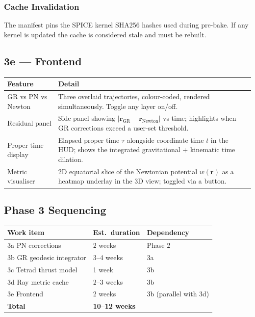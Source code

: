 \documentclass[11pt, a4paper]{article}
\begin{document}
\subsubsection{Cache Invalidation}

The manifest pins the SPICE kernel SHA256 hashes used during pre-bake. If any
kernel is updated the cache is considered stale and must be rebuilt.

\subsection{3e — Frontend}

\begin{center}
\begin{tabularx}{\textwidth}{L{3.5cm} X}
  \toprule
  \textbf{Feature} & \textbf{Detail} \\
  \midrule
  GR vs PN vs Newton &
    Three overlaid trajectories, colour-coded, rendered simultaneously.
    Toggle any layer on/off. \\[4pt]
  Residual panel &
    Side panel showing $|\mathbf{r}_\text{GR} - \mathbf{r}_\text{Newton}|$
    vs time; highlights when GR corrections exceed a user-set threshold. \\[4pt]
  Proper time display &
    Elapsed proper time $\tau$ alongside coordinate time $t$ in the HUD;
    shows the integrated gravitational + kinematic time dilation. \\[4pt]
  Metric visualiser &
    2D equatorial slice of the Newtonian potential $w(\mathbf{r})$ as a
    heatmap underlay in the 3D view; toggled via a button. \\
  \bottomrule
\end{tabularx}
\end{center}

\subsection{Phase 3 Sequencing}

\begin{center}
\begin{tabular}{L{5cm} C{2.5cm} L{5.5cm}}
  \toprule
  \textbf{Work item} & \textbf{Est.\ duration} & \textbf{Dependency} \\
  \midrule
  3a PN corrections        & 2 weeks    & Phase 2 \\
  3b GR geodesic integrator& 3--4 weeks & 3a \\
  3c Tetrad thrust model   & 1 week     & 3b \\
  3d Ray metric cache      & 2--3 weeks & 3b \\
  3e Frontend              & 2 weeks    & 3b (parallel with 3d) \\
  \midrule
  \textbf{Total}           & \textbf{10--12 weeks} & \\
  \bottomrule
\end{tabular}
\end{center}
\end{document}
